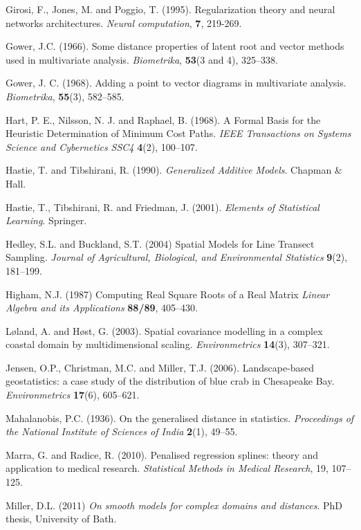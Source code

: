 \documentclass[useAMS, referee]{biom}
\begin{document}
\begin{thebibliography}{99}
\bibitem{} Girosi, F., Jones, M. and Poggio, T. (1995). Regularization theory and neural networks architectures. \textit{Neural computation}, \textbf{7}, 219-269.

\bibitem{} Gower, J.C. (1966). Some distance properties of latent root and vector methods used in multivariate analysis. \textit{Biometrika}, \textbf{53}(3 and 4), 325--338.

\bibitem{} Gower, J. C. (1968). Adding a point to vector diagrams in multivariate analysis. \textit{Biometrika}, \textbf{55}(3), 582--585.

\bibitem{} Hart, P. E., Nilsson, N. J. and Raphael, B. (1968). A Formal Basis for the Heuristic Determination of Minimum Cost Paths. \textit{IEEE Transactions on Systems Science and Cybernetics SSC4} \textbf{4}(2), 100--107.

\bibitem{} Hastie, T. and Tibshirani, R. (1990). \textit{Generalized Additive Models}. Chapman \& Hall.

\bibitem{} Hastie, T., Tibshirani, R. and Friedman, J. (2001). \textit{Elements of Statistical Learning}. Springer.

\bibitem{ } Hedley, S.L. and Buckland, S.T. (2004) Spatial Models for Line Transect Sampling. \textit{Journal of Agricultural, Biological, and Environmental Statistics} \textbf{9}(2), 181--199.

\bibitem{ } Higham, N.J. (1987) Computing Real Square Roots of a Real Matrix
 \textit{Linear Algebra and its Applications} \textbf{88/89}, 405--430.


\bibitem{} L{\o}land, A. and H{\o}st, G. (2003). Spatial covariance modelling in a complex coastal domain by multidimensional scaling. \textit{Environmetrics} \textbf{14}(3), 307--321.

\bibitem{} Jensen, O.P., Christman, M.C. and Miller, T.J. (2006). Landscape-based geostatistics: a case study of the distribution of blue crab in {C}hesapeake {B}ay. \textit{Environmetrics} \textbf{17}(6), 605--621.

\bibitem{} Mahalanobis, P.C. (1936). On the generalised distance in statistics. \textit{Proceedings of the National Institute of Sciences of India} \textbf{2}(1), 49--55.

\bibitem{} Marra, G. and Radice, R. (2010). Penalised regression splines: theory and application to medical research. \textit{Statistical Methods in Medical Research}, 19, 107--125.

\bibitem{} Miller, D.L. (2011) \textit{On smooth models for complex domains and distances}. PhD thesis, University of Bath.


\end{thebibliography}
\end{document}
